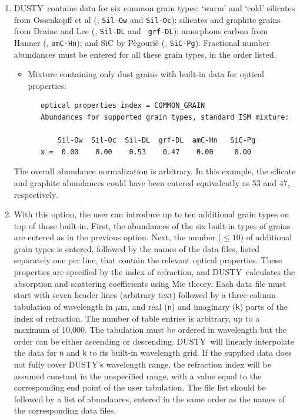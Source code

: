 \documentclass[11pt]{article}
\def\D  {{\sf DUSTY}}
\def\mic    {\hbox{$\mu$m}}
\begin{document}
\begin{enumerate}

\item \D\ contains data for six common grain types: `warm' and `cold' silicates
from Ossenkopff et al (\cite{Oss92}, {\tt Sil-Ow} and {\tt Sil-Oc}); silicates
and graphite grains from Draine and Lee (\cite{DL84}, {\tt Sil-DL} and {\tt
grf-DL}); amorphous carbon from Hanner (\cite{Hann88}, {\tt amC-Hn}); and SiC
by P\`egouri\`e (\cite{Peg88}, {\tt SiC-Pg}).  Fractional number abundances
must be entered for all these grain types, in the order listed.

\begin{itemize}
\item
Mixture containing only dust grains with built-in data for optical
properties:

\begin{verbatim}
   optical properties index = COMMON_GRAIN
   Abundances for supported grain types, standard ISM mixture:

       Sil-Ow  Sil-Oc  Sil-DL  grf-DL  amC-Hn   SiC-Pg
   x =  0.00    0.00    0.53    0.47    0.00     0.00
\end{verbatim}
\end{itemize}
The overall abundance normalization is arbitrary.  In this example, the
silicate and graphite abundances could have been entered equivalently as 53 and
47, respectively.

\item
With this option, the user can introduce up to ten additional grain types
on top of those built-in.  First, the abundances of the six built-in types of
grains are entered as in the previous option. Next, the number ($\le 10$) of
additional grain types is entered, followed by the names of the data files,
listed separately one per line, that contain the relevant optical properties.
These properties are specified by the index of refraction, and \D\ calculates
the absorption and scattering coefficients using Mie theory.  Each data file
must start with seven header lines (arbitrary text) followed by a three-column
tabulation of wavelength in \mic, and real ({\tt n}) and imaginary ({\tt k})
parts of the index of refraction. The number of table entries is arbitrary, up
to a maximum of 10,000. The tabulation must be ordered in wavelength but the
order can be either ascending or descending. \D\ will linearly interpolate the
data for {\tt n} and {\tt k} to its built-in wavelength grid. If the supplied
data does not fully cover \D's wavelength range, the refraction index will be
assumed constant in the unspecified range, with a value equal to the
corresponding end point of the user tabulation. The file list should be
followed by a list of abundances, entered in the same order as the names of the
corresponding data files.


\end{enumerate}
\end{document}
